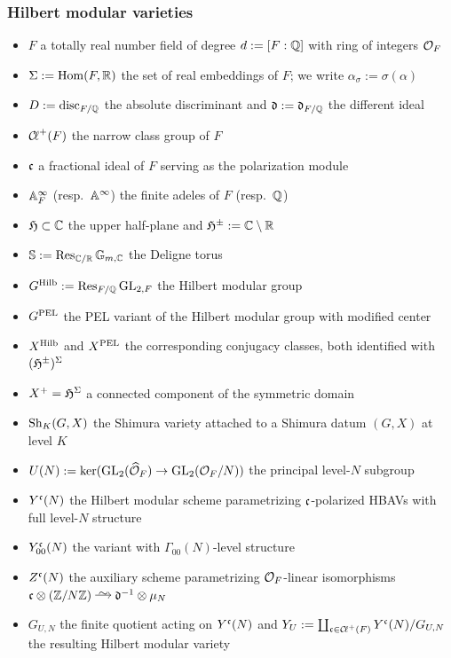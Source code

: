\documentclass[main.tex]{subfiles}
\begin{document}
\subsubsection*{Hilbert modular varieties}
\begin{itemize}
\item $F$ a totally real number field of degree $d := [F:\mathbb{Q}]$ with ring of integers $\mathcal{O}_F$
\item $\Sigma := \operatorname{\mathrm{Hom}}(F,\mathbb{R})$ the set of real embeddings of $F$; we write $\alpha_{\sigma} := \sigma(\alpha)$
\item $D := \mathrm{disc}_{F/\mathbb{Q}}$ the absolute discriminant and $\mathfrak{d} := \mathfrak{d}_{F/\mathbb{Q}}$ the different ideal
\item $\operatorname{\mathcal{C}\!{\ell}}^+(F)$ the narrow class group of $F$
\item $\mathfrak{c}$ a fractional ideal of $F$ serving as the polarization module
\item $\mathbb{A}_F^{\infty}$ (resp.\ $\mathbb{A}^{\infty}$) the finite adeles of $F$ (resp.\ $\mathbb{Q}$)
\item $\mathfrak{H} \subset \mathbb{C}$ the upper half-plane and $\mathfrak{H}^\pm := \mathbb{C} \setminus \mathbb{R}$
\item $\mathbb{S} := \operatorname{\mathrm{Res}}_{\mathbb{C}/\mathbb{R}} \mathbb{G}_{m,\mathbb{C}}$ the Deligne torus
\item $G^{\operatorname{\mathrm{Hilb}}} := \operatorname{\mathrm{Res}}_{F/\mathbb{Q}} \mathrm{GL}_{2,F}$ the Hilbert modular group
\item $G^{\mathrm{PEL}}$ the PEL variant of the Hilbert modular group with modified center
\item $X^{\operatorname{\mathrm{Hilb}}}$ and $X^{\mathrm{PEL}}$ the corresponding conjugacy classes, both identified with $(\mathfrak{H}^\pm)^{\Sigma}$
\item $X^+ = \mathfrak{H}^{\Sigma}$ a connected component of the symmetric domain
\item $\mathrm{Sh}_K(G,X)$ the Shimura variety attached to a Shimura datum $(G,X)$ at level $K$
\item $U(N) := \ker(\mathrm{GL}_2(\widehat{\mathcal{O}}_F) \to \mathrm{GL}_2(\mathcal{O}_F/N))$ the principal level-$N$ subgroup
\item $Y^{\mathfrak{c}}(N)$ the Hilbert modular scheme parametrizing $\mathfrak{c}$-polarized HBAVs with full level-$N$ structure
\item $Y^{\mathfrak{c}}_{00}(N)$ the variant with $\Gamma_{00}(N)$-level structure
\item $Z^{\mathfrak{c}}(N)$ the auxiliary scheme parametrizing $\mathcal{O}_F$-linear isomorphisms $\cc \ot (\Z/N\Z) \iso \dd^{-1} \ot \mu_N$
\item $G_{U,N}$ the finite quotient acting on $Y^{\mathfrak{c}}(N)$ and $Y_U := \coprod_{\mathfrak{c} \in \operatorname{\mathcal{C}\!{\ell}}^+(F)} Y^{\mathfrak{c}}(N)/G_{U,N}$ the resulting Hilbert modular variety

\end{itemize}
\end{document}
